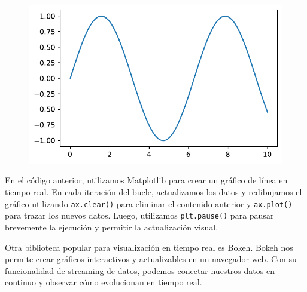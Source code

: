 \documentclass[
  a4paper,
]{article}
\begin{document}
\begin{figure}[H]

{\centering \includegraphics{index_files/figure-pdf/cell-2-output-1.pdf}

}

\end{figure}

En el código anterior, utilizamos Matplotlib para crear un gráfico de
línea en tiempo real. En cada iteración del bucle, actualizamos los
datos y redibujamos el gráfico utilizando \texttt{ax.clear()} para
eliminar el contenido anterior y \texttt{ax.plot()} para trazar los
nuevos datos. Luego, utilizamos \texttt{plt.pause()} para pausar
brevemente la ejecución y permitir la actualización visual.

Otra biblioteca popular para visualización en tiempo real es Bokeh.
Bokeh nos permite crear gráficos interactivos y actualizables en un
navegador web. Con su funcionalidad de streaming de datos, podemos
conectar nuestros datos en continuo y observar cómo evolucionan en
tiempo real.
\end{document}
